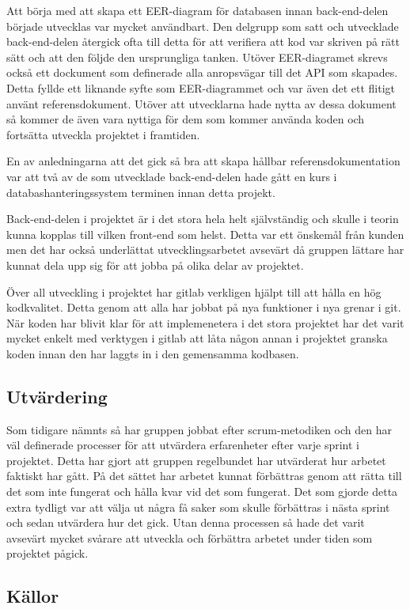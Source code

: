 Att börja med att skapa ett EER-diagram för databasen innan back-end-delen började utvecklas var mycket användbart. Den delgrupp som satt och utvecklade back-end-delen återgick ofta till detta för att verifiera att kod var skriven på rätt sätt och att den följde den ursprungliga tanken. Utöver EER-diagramet skrevs också ett dockument som definerade alla anropsvägar till det API som skapades. Detta fyllde ett liknande syfte som EER-diagrammet och var även det ett flitigt använt referensdokument. Utöver att utvecklarna hade nytta av dessa dokument så kommer de även vara nyttiga för dem som kommer använda koden och fortsätta utveckla projektet i framtiden.

En av anledningarna att det gick så bra att skapa hållbar referensdokumentation var att två av de som utvecklade back-end-delen hade gått en kurs i databashanteringssystem terminen innan detta projekt.

Back-end-delen i projektet är i det stora hela helt självständig och skulle i teorin kunna kopplas till vilken front-end som helst. Detta var ett önskemål från kunden men det har också underlättat utvecklingsarbetet avsevärt då gruppen lättare har kunnat dela upp sig för att jobba på olika delar av projektet.

Över all utveckling i projektet har gitlab verkligen hjälpt till att hålla en hög kodkvalitet. Detta genom att alla har jobbat på nya funktioner i nya grenar i git. När koden har blivit klar för att implemenetera i det stora projektet har det varit mycket enkelt med verktygen i gitlab att låta någon annan i projektet granska koden innan den har laggts in i den gemensamma kodbasen.

\subsection{Utvärdering}
Som tidigare nämnts så har gruppen jobbat efter scrum-metodiken och den har väl definerade processer för att utvärdera erfarenheter efter varje sprint i projektet. Detta har gjort att gruppen regelbundet har utvärderat hur arbetet faktiskt har gått. På det sättet har arbetet kunnat förbättras genom att rätta till det som inte fungerat och hålla kvar vid det som fungerat. Det som gjorde detta extra tydligt var att välja ut några få saker som skulle förbättras i nästa sprint och sedan utvärdera hur det gick. Utan denna processen så hade det varit avsevärt mycket svårare att utveckla och förbättra arbetet under tiden som projektet pågick.

\subsection{Källor}


